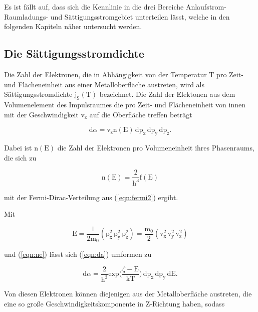 \noindent
Es ist fällt auf, dass sich die Kennlinie in die drei Bereiche Anlaufstrom- Raumladungs- und Sättigungsstromgebiet unterteilen lässt,
welche in den folgenden Kapiteln näher untersucht werden.


\subsection{Die Sättigungsstromdichte}

\noindent
Die Zahl der Elektronen, die in Abhängigkeit von der Temperatur T pro Zeit- und Flächeneinheit aus einer Metalloberfläche austreten, 
wird als Sättigungsstromdichte $\text{j}_\text{S}(\text{T})$ bezeichnet.
Die Zahl der Elektonen aus dem Volumenelement des Impulsraumes die pro Zeit- und Flächeneinheit von innen 
mit der Geschwindigkeit $\text{v}_\text{z}$ auf die Oberfläche treffen beträgt

\begin{equation}
\text{d}\alpha = \text{v}_\text{z} \text{n}(\text{E}) \, \text{dp}_\text{x} \, \text{dp}_\text{y} \, \text{dp}_\text{z}.
\label{eqn:da}
\end{equation}

\noindent
Dabei ist $\text{n}(\text{E})$ die Zahl der Elektronen pro Volumeneinheit ihres Phasenraums, die sich zu

\begin{equation}
\text{n}(\text{E}) = \frac{2}{\text{h}^3} \text{f}(\text{E})
\label{eqn:ne}
\end{equation}

\noindent
mit der Fermi-Dirac-Verteilung aus (\ref{eqn:fermi2}) ergibt.

\noindent
Mit

\begin{equation}
\text{E} = \frac{1}{2\text{m}_0}(\text{p}_\text{x}^2 \, \text{p}_\text{y}^2 \,\text{p}_\text{z}^2) = \frac{\text{m}_0}{2} (\text{v}_\text{x}^2 \, \text{v}_\text{y}^2 \, \text{v}_\text{z}^2)
\end{equation}

\noindent
und (\ref{eqn:ne}) lässt sich (\ref{eqn:da}) umformen zu 

\begin{equation}
    \text{d}\alpha = \frac{2}{\text{h}^3} \text{exp} \biggl( \frac{\zeta-\text{E}}{\text{kT}} \biggr) \, \text{dp}_\text{x} \, \text{dp}_\text{y} \,\text{dE}.
\end{equation}

\noindent
Von diesen Elektronen können diejenigen aus der Metalloberfläche austreten, die eine so große Geschwindigkeitskomponente in Z-Richtung haben, sodass

